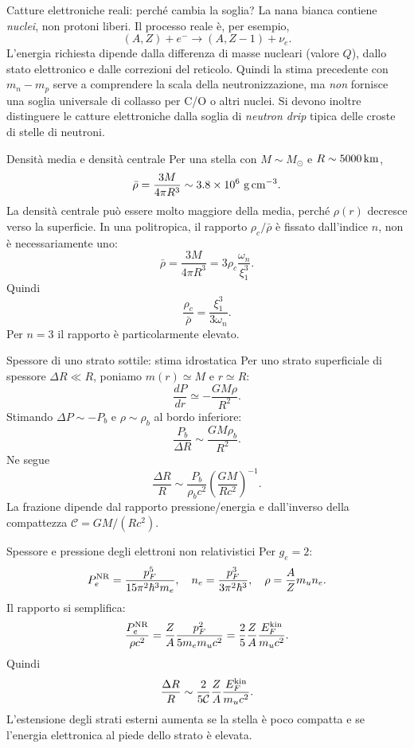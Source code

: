 \begin{frame}[t]{Catture elettroniche reali: perché cambia la soglia?}
\small
La nana bianca contiene \emph{nuclei}, non protoni liberi. Il processo reale è, per esempio,
\[
(A,Z)+e^-\longrightarrow(A,Z-1)+\nu_e.
\]
L'energia richiesta dipende dalla differenza di masse nucleari (valore $Q$), dallo stato elettronico e dalle correzioni del reticolo.
\medskip
Quindi la stima precedente con $m_n-m_p$ serve a comprendere la scala della neutronizzazione, ma \emph{non} fornisce una soglia universale di collasso per C/O o altri nuclei.
\medskip
Si devono inoltre distinguere le catture elettroniche dalla soglia di \emph{neutron drip} tipica delle croste di stelle di neutroni.
\end{frame}

\begin{frame}[t]{Densità media e densità centrale}
\small
Per una stella con $M\sim M_\odot$ e $R\sim5000\,{\rm km}$,
\[
\bar\rho=\frac{3M}{4\pi R^3}
\sim3.8\times10^6\ {\rm g\,cm^{-3}}.
\]
La densità centrale può essere molto maggiore della media, perché $\rho(r)$ decresce verso la superficie.
\medskip
In una politropica, il rapporto $\rho_c/\bar\rho$ è fissato dall'indice $n$, non è necessariamente uno:
\[
\bar\rho=\frac{3M}{4\pi R^3}
=3\rho_c\frac{\omega_n}{\xi_1^3}.
\]
Quindi
\[
\frac{\rho_c}{\bar\rho}=\frac{\xi_1^3}{3\omega_n}.
\]
Per $n=3$ il rapporto è particolarmente elevato.
\end{frame}

\begin{frame}[t]{Spessore di uno strato sottile: stima idrostatica}
\small
Per uno strato superficiale di spessore $\Delta R\ll R$, poniamo $m(r)\simeq M$ e $r\simeq R$:
\[
\frac{dP}{dr}\simeq-\frac{GM\rho}{R^2}.
\]
Stimando $\Delta P\sim-P_b$ e $\rho\sim\rho_b$ al bordo inferiore:
\[
\frac{P_b}{\Delta R}\sim\frac{GM\rho_b}{R^2}.
\]
Ne segue
\[
\frac{\Delta R}{R}\sim\frac{P_b}{\rho_b c^2}
\left(\frac{GM}{Rc^2}\right)^{-1}.
\]
La frazione dipende dal rapporto pressione/energia e dall'inverso della compattezza $\mathcal C=GM/(Rc^2)$.
\end{frame}

\begin{frame}[t]{Spessore e pressione degli elettroni non relativistici}
\small
Per $g_e=2$:
\[
P_e^{\rm NR}=\frac{p_F^5}{15\pi^2\hbar^3m_e},\quad
n_e=\frac{p_F^3}{3\pi^2\hbar^3},\quad
\rho=\frac AZ m_un_e.
\]
Il rapporto si semplifica:
\[
\frac{P_e^{\rm NR}}{\rho c^2}
=\frac Z A\frac{p_F^2}{5m_em_uc^2}
=\frac25\frac Z A\frac{E_F^{\rm kin}}{m_uc^2}.
\]
Quindi
\[
\frac{\Delta R}{R}\sim
\frac{2}{5\mathcal C}\frac ZA\frac{E_F^{\rm kin}}{m_uc^2}.
\]
L'estensione degli strati esterni aumenta se la stella è poco compatta e se l'energia elettronica al piede dello strato è elevata.
\end{frame}

